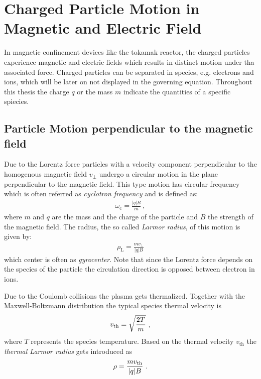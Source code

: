 \section{Charged Particle Motion in Magnetic and Electric Field}
\label{sec:motion}

In magnetic confinement devices like the tokamak reactor, the charged particles experience magnetic and electric fields which results in distinct motion under tha associated force. Charged particles can be separated in species, e.g. electrons and ions, which will be later on not displayed in the governing equation. Throughout this thesis the charge $q$ or the mass $m$ indicate the quantities of a specific spiecies.

\subsection{Particle Motion perpendicular to the magnetic field}
\label{sub:gyromotion}

Due to the Lorentz force particles with a velocity component perpendicular to the homogenous magnetic field $v_{\perp}$ undergo a circular motion in the plane perpendicular to the magnetic field. This type motion has circular frequency which is often referred as \textit{cyclotron frequency} and is defined as:
\begin{gather}
    \omega_\mathrm{c} = \frac{|q|B}{m}~,
\end{gather}
where $m$ and $q$ are the mass and the charge of the particle and $B$ the strength of the magnetic field. The radius, the so called \textit{Larmor radius}, of this motion is given by:
\begin{gather}
    \rho_\mathrm{L} = \frac{mv_{\perp}}{|q|B}
\end{gather}
which center is often as \textit{gyrocenter}. Note that since the Lorentz force depends on the species of the particle the circulation direction is opposed between electron in ions. 

Due to the Coulomb collisions the plasma gets thermalized. Together with the Maxwell-Boltzmann distribution the typical species thermal velocity is
\begin{gather}
    v_{\mathrm{th}} = \sqrt{\frac{2T}{m}}~,
\end{gather}
where $T$ represents the species temperature. Based on the thermal velocity $v_\mathrm{th}$ the \textit{thermal Larmor radius} gets introduced as \cite{Wesson2011}
\begin{gather}
    \rho = \frac{mv_{\mathrm{th}}}{|q|B}~.
\end{gather}

